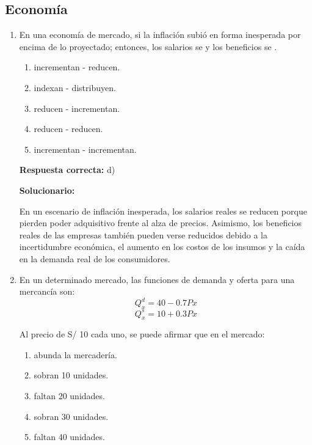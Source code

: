 \subsection*{Economía}

\begin{enumerate}[resume]

\item En una economía de mercado, si la inflación subió en forma inesperada por encima de lo proyectado; entonces, los salarios se \underline{\hspace{2cm}} y los beneficios se \underline{\hspace{2cm}}.

\begin{enumerate}[label=\alph*)]
	\item incrementan - reducen.
	\item indexan - distribuyen.
	\item reducen - incrementan.
	\item reducen - reducen.
	\item incrementan - incrementan.
\end{enumerate}

\textbf{Respuesta correcta:} d)

\vspace{2mm}
\textbf{Solucionario:}

En un escenario de inflación inesperada, los salarios reales se reducen porque pierden poder adquisitivo frente al alza de precios. Asimismo, los beneficios reales de las empresas también pueden verse reducidos debido a la incertidumbre económica, el aumento en los costos de los insumos y la caída en la demanda real de los consumidores.

\vspace{6mm}

\item En un determinado mercado, las funciones de demanda y oferta para una mercancía son:
\[ Q_x^d = 40 - 0.7Px \]
\[ Q_x^s = 10 + 0.3Px \]

Al precio de S/ 10 cada uno, se puede afirmar que en el mercado:

\begin{enumerate}[label=\alph*)]
	\item abunda la mercadería.
	\item sobran 10 unidades.
	\item faltan 20 unidades.
	\item sobran 30 unidades.
	\item faltan 40 unidades.
\end{enumerate}


\end{enumerate}
